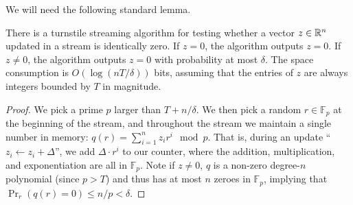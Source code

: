 We will need the following standard lemma.

\begin{lemma}\label{lem:zero-test}
There is a turnstile streaming algorithm for testing whether a vector $z\in\mathbb{R}^n$ updated in a stream is identically zero. If $z=0$, the algorithm outputs $z=0$. If $z\neq 0$, the algorithm outputs $z=0$ with probability at most $\delta$. The space consumption is $O(\log(nT/\delta))$ bits, assuming that the entries of $z$ are always integers bounded by $T$ in magnitude.
\end{lemma}
\begin{proof}
We pick a prime $p$ larger than $T + n/\delta$. We then pick a random $r\in\mathbb{F}_p$ at the beginning of the stream, and throughout the stream we maintain a single number in memory: $q(r) = \sum_{i=1}^n z_i r^i\mod p$. That is, during an update ``$z_i\leftarrow z_i + \Delta$'', we add $\Delta \cdot r^i$ to our counter, where the addition, multiplication, and exponentiation are all in $\mathbb{F}_p$. Note if $z\neq 0$, $q$ is a non-zero degree-$n$ polynomial (since $p > T$) and thus has at most $n$ zeroes in $\mathbb{F}_p$, implying that $\Pr_r(q(r) = 0) \le n/p < \delta$.
\end{proof}

